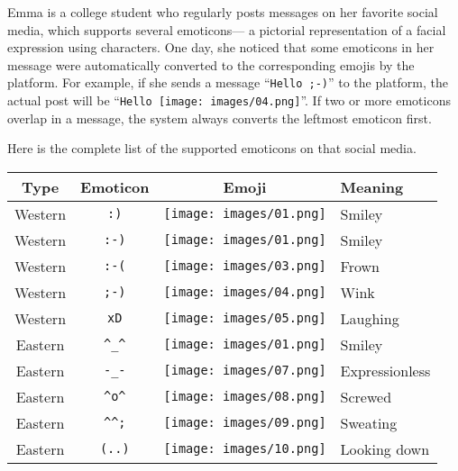 
Emma is a college student who regularly posts messages on her favorite social media,
which supports several emoticons---%
a pictorial representation of a facial expression using characters.
%
One day, she noticed that some emoticons in her message were automatically converted to
the corresponding emojis by the platform.
%
For example, if she sends a message ``\texttt{Hello ;-)}'' to the platform,
the actual post will be ``\texttt{Hello }\texttt{[image: images/04.png]}''.
%
If two or more emoticons overlap in a message,
the system always converts the leftmost emoticon first.

Here is the complete list of the supported emoticons on that social media.

\vspace*{1em}
\renewcommand{\arraystretch}{1.4}
\begin{tabular}{c|c|c|l} 
  Type & Emoticon & Emoji & Meaning\\
  \hline\hline
  Western & \texttt{:)}  & \texttt{[image: images/01.png]} & Smiley\\
  Western & \texttt{:-)} & \texttt{[image: images/01.png]} & Smiley\\
  Western & \texttt{:-(} & \texttt{[image: images/03.png]} & Frown\\
  Western & \texttt{;-)} & \texttt{[image: images/04.png]} & Wink\\
  Western & \texttt{xD}  & \texttt{[image: images/05.png]} & Laughing\\
  \hline
  Eastern & \texttt{\textasciicircum{}\_\textasciicircum{}} & \texttt{[image: images/01.png]} & Smiley\\
  Eastern & \texttt{-\_-}                                   & \texttt{[image: images/07.png]} & Expressionless\\
  Eastern & \texttt{\textasciicircum{}o\textasciicircum{}}  & \texttt{[image: images/08.png]} & Screwed\\
  Eastern & \texttt{\textasciicircum{}\textasciicircum{};}  & \texttt{[image: images/09.png]} & Sweating\\
  Eastern & \texttt{(..)}                                   & \texttt{[image: images/10.png]} & Looking down\\
\end{tabular}
\renewcommand{\arraystretch}{1}
\vspace*{1em}

